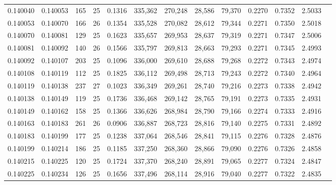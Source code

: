 \begin{tabular}{rrrrrrrrrrrrr}
0.140040 & 0.140053 &   165 &  25 &                                     0.1316 & 335,362 & 270,248 &  28,586 &  79,370 & 0.2270 & 0.7352 & 2.5033 \\
0.140053 & 0.140070 &   166 &  26 &                                     0.1354 & 335,528 & 270,082 &  28,612 &  79,344 & 0.2271 & 0.7350 & 2.5018 \\
0.140070 & 0.140081 &   129 &  25 &                                     0.1623 & 335,657 & 269,953 &  28,637 &  79,319 & 0.2271 & 0.7347 & 2.5006 \\
0.140081 & 0.140092 &   140 &  26 &                                     0.1566 & 335,797 & 269,813 &  28,663 &  79,293 & 0.2271 & 0.7345 & 2.4993 \\
0.140092 & 0.140107 &   203 &  25 &                                     0.1096 & 336,000 & 269,610 &  28,688 &  79,268 & 0.2272 & 0.7343 & 2.4974 \\
0.140108 & 0.140119 &   112 &  25 &                                     0.1825 & 336,112 & 269,498 &  28,713 &  79,243 & 0.2272 & 0.7340 & 2.4964 \\
0.140119 & 0.140138 &   237 &  27 &                                     0.1023 & 336,349 & 269,261 &  28,740 &  79,216 & 0.2273 & 0.7338 & 2.4942 \\
0.140138 & 0.140149 &   119 &  25 &                                     0.1736 & 336,468 & 269,142 &  28,765 &  79,191 & 0.2273 & 0.7335 & 2.4931 \\
0.140149 & 0.140162 &   158 &  25 &                                     0.1366 & 336,626 & 268,984 &  28,790 &  79,166 & 0.2274 & 0.7333 & 2.4916 \\
0.140163 & 0.140183 &   261 &  26 &                                     0.0906 & 336,887 & 268,723 &  28,816 &  79,140 & 0.2275 & 0.7331 & 2.4892 \\
0.140183 & 0.140199 &   177 &  25 &                                     0.1238 & 337,064 & 268,546 &  28,841 &  79,115 & 0.2276 & 0.7328 & 2.4876 \\
0.140199 & 0.140214 &   186 &  25 &                                     0.1185 & 337,250 & 268,360 &  28,866 &  79,090 & 0.2276 & 0.7326 & 2.4858 \\
0.140215 & 0.140225 &   120 &  25 &                                     0.1724 & 337,370 & 268,240 &  28,891 &  79,065 & 0.2277 & 0.7324 & 2.4847 \\
0.140225 & 0.140234 &   126 &  25 &                                     0.1656 & 337,496 & 268,114 &  28,916 &  79,040 & 0.2277 & 0.7322 & 2.4835 \\

\end{tabular}

